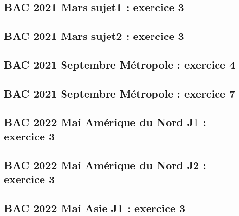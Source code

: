 \documentclass[lang=fr,edition=teacher,layout=sheet]{mxbook}
\begin{document}
\begingroup\endgroup
\par\bigskip
{}\subsection*{BAC 2021 Mars sujet1 : exercice 3}
\begingroup\endgroup
\par\bigskip
{}\subsection*{BAC 2021 Mars sujet2 : exercice 3}
\begingroup\endgroup
\par\bigskip
{}\subsection*{BAC 2021 Septembre Métropole : exercice 4}
\begingroup\endgroup
\par\bigskip
{}\subsection*{BAC 2021 Septembre Métropole : exercice 7}
\begingroup\endgroup
\par\bigskip
{}\subsection*{BAC 2022 Mai Amérique du Nord J1 : exercice 3}
\begingroup\endgroup
\par\bigskip
{}\subsection*{BAC 2022 Mai Amérique du Nord J2 : exercice 3}
\begingroup\endgroup
\par\bigskip
{}\subsection*{BAC 2022 Mai Asie J1 : exercice 3}
\end{document}
